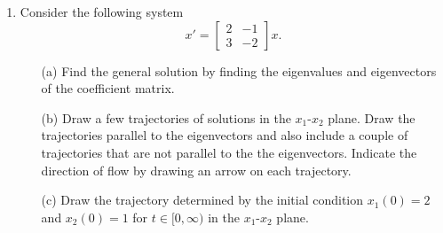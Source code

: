 \documentclass[11pt]{article}
\theoremstyle{definition}
\begin{document}
\begin{enumerate}[leftmargin=*]
\item Consider the following system 
\[
x'=\left[
\begin{array}{cc}
2 & -1\\
3 & -2
\end{array}\right]x.
\]
\begin{itemize}
\item [(a)] Find the general solution by finding the eigenvalues and eigenvectors of the coefficient matrix.
\item [(b)] Draw a few trajectories of solutions in the $x_1$-$x_2$ plane.  Draw the trajectories parallel to the eigenvectors and also include a couple of trajectories that are not parallel to the the eigenvectors.    Indicate the direction of flow by drawing an arrow on each trajectory.
\item [(c)] Draw the trajectory determined by the initial condition $x_1(0)=2$ and $x_2(0)=1$ for $t\in [0,\infty)$ in the $x_1$-$x_2$ plane.
\end{itemize}


\end{enumerate}
\end{document}

